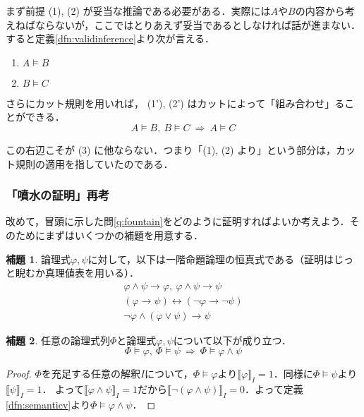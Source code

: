 \documentclass[uplatex,a4paper,dvipdfmx]{jsarticle}
\newcommand{\semvalue}[1]{\llbracket {#1} \rrbracket}
\theoremstyle{definition}
\newtheorem{lem}{補題}
\begin{document}
            まず前提 (1), (2) が妥当な推論である必要がある．実際には$A$や$B$の内容から考えねばならないが，ここではとりあえず妥当であるとしなければ話が進まない．
            すると定義\ref{dfn:validinference}より次が言える．
            \begin{enumerate}[(1')]
                \item $A \vDash B$
                \item $B \vDash C$
            \end{enumerate}

            さらにカット規則を用いれば， (1'), (2') はカットによって「組み合わせ」ることができる．
            \begin{equation*}
                A \vDash B,\ B \vDash C\ \Longrightarrow\ A \vDash C
            \end{equation*}

            この右辺こそが (3) に他ならない．つまり「(1), (2) より」という部分は，カット規則の適用を指していたのである．
            
            \subsubsection{「噴水の証明」再考}
                改めて，冒頭に示した問\ref{q:fountain}をどのように証明すればよいか考えよう．そのためにまずはいくつかの補題を用意する．

                \begin{lem}\label{lem:first}
                    論理式$\varphi, \psi$に対して，以下は一階命題論理の恒真式である（証明はじっと睨むか真理値表を用いる）．
                    \begin{gather}
                        \varphi \land \psi \to \varphi,\ \varphi \land \psi \to \psi \tag{縮小律} \\
                        (\varphi \to \psi) \leftrightarrow (\lnot\varphi \to \lnot\psi) \tag{対偶律} \\
                        \lnot \varphi \land (\varphi \lor \psi) \to \psi \tag{選言的三段論法}
                    \end{gather}
                \end{lem}
                \begin{lem}\label{lem:second}
                    任意の論理式列$\Phi$と論理式$\varphi, \psi$について以下が成り立つ．
                    \begin{equation}
                        \Phi \vDash \varphi,\ \Phi \vDash \psi\ \Longrightarrow \ \Phi \vDash \varphi \land \psi
                    \end{equation}
                \end{lem}
                \begin{proof}
                    $\Phi$を充足する任意の解釈$I$について，$\Phi \vDash \varphi$より$\semvalue{\varphi}_I = 1$．同様に$\Phi \vDash \psi$より$\semvalue{\psi}_I = 1$．
                    よって$\semvalue{\varphi \land \psi}_I = 1$だから$\semvalue{\lnot(\varphi \land \psi)}_I = 0$．よって定義\ref{dfn:semanticv}より$\Phi \vDash \varphi \land \psi$．
                \end{proof}
\end{document}
